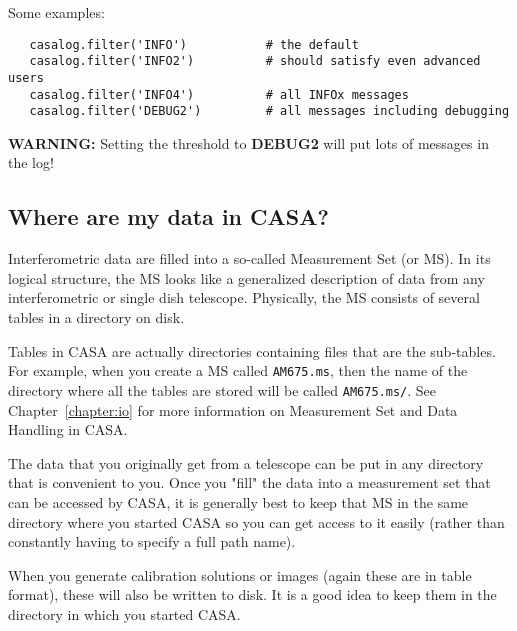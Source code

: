 Some examples:
\small
\begin{verbatim}
   casalog.filter('INFO')           # the default
   casalog.filter('INFO2')          # should satisfy even advanced users
   casalog.filter('INFO4')          # all INFOx messages
   casalog.filter('DEBUG2')         # all messages including debugging
\end{verbatim}
\normalsize

{\bf WARNING:} Setting the threshold to {\bf DEBUG2} will put lots of
messages in the log!


\subsection{Where are my data in CASA?}
\label{section:intro.common.data}

Interferometric data are filled into a so-called Measurement Set (or
MS).  In its logical structure, the MS looks like a generalized
description of data from any interferometric
or single dish telescope. Physically, the MS consists of several
tables in a directory on disk.  

Tables in CASA are actually directories containing files that are the
sub-tables.  For example, when you create a MS called {\tt AM675.ms},
then the name of the directory where all the tables are stored will be
called {\tt AM675.ms/}.  See Chapter~\ref{chapter:io} for more
information on Measurement Set and Data Handling in CASA.

The data that you originally get from a telescope can be put in any
directory that is convenient to you.  Once you "fill" the data into a
measurement set that can be accessed by CASA, it is generally best to
keep that MS in the same directory where you started CASA so you can
get access to it easily (rather than constantly having to specify a
full path name).

When you generate calibration solutions or images (again these
are in table format), these will also be written to disk.  It is a
good idea to keep them in the directory in which you started CASA.

